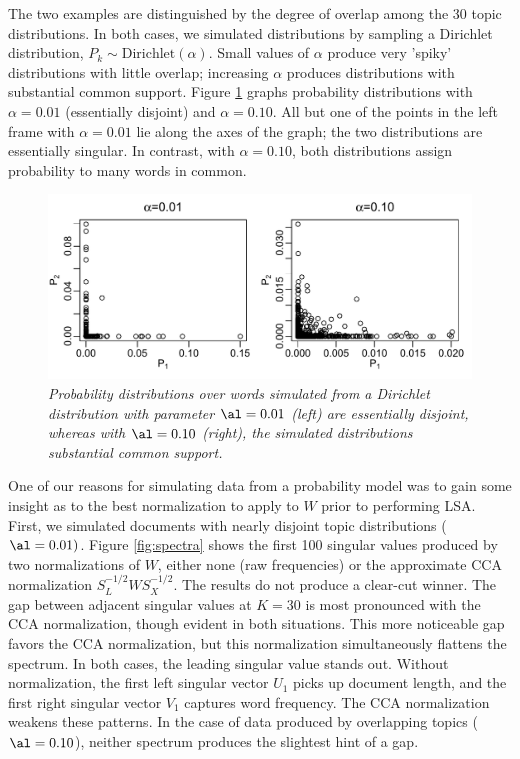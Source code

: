 \documentclass[12pt]{article}
\begin{document}
The two examples are distinguished by the degree of overlap among the 30 topic distributions.  In both cases, we simulated distributions by sampling a Dirichlet distribution, $P_k \sim \mbox{Dirichlet}(\alpha)$. Small values of $\alpha$ produce very 'spiky' distributions with little overlap; increasing $\alpha$ produces distributions with substantial common support.   Figure \ref{fig:P} graphs probability distributions with $\alpha = 0.01$ (essentially disjoint) and $\alpha = 0.10$.  All but one of the points in the left frame with $\alpha=0.01$ lie along the axes of the graph; the two distributions are essentially singular.  In contrast, with $\alpha=0.10$, both distributions assign  probability to many words in common.


\begin{figure}
\caption{ \label{fig:P}
{ \sl  Probability distributions over words simulated from a Dirichlet distribution with parameter $\al = 0.01$ (left) are essentially disjoint, whereas with $\al = 0.10$ (right), the simulated distributions substantial common support.}}
 \centerline{
 \vspace{0.1in}
 \includegraphics[width=7.5in]{figures/P} }
 \end{figure}


 One of our reasons for simulating data from  a probability model  was to gain some insight as to the best normalization to apply to $W$ prior to performing LSA.  First, we simulated documents with nearly disjoint topic distributions ($\al = 0.01)$.  Figure \ref{fig:spectra} shows the first 100 singular values produced by two normalizations of $W$, either none (raw frequencies) or the approximate CCA normalization $S_L^{-1/2}WS_X^{-1/2}$. The results do not produce a clear-cut winner. The gap between adjacent singular values at $K=30$ is most pronounced with the CCA normalization, though evident in both situations. This more noticeable gap favors the CCA normalization, but this normalization simultaneously flattens the spectrum.  In both cases, the leading singular value stands out. Without normalization, the first left singular vector $U_1$ picks up document length, and the first right singular vector $V_1$ captures word frequency.  The CCA normalization weakens these patterns.  In the case of data produced by overlapping topics ($\al = 0.10$), neither spectrum produces the slightest hint of a gap.
 
\end{document}
